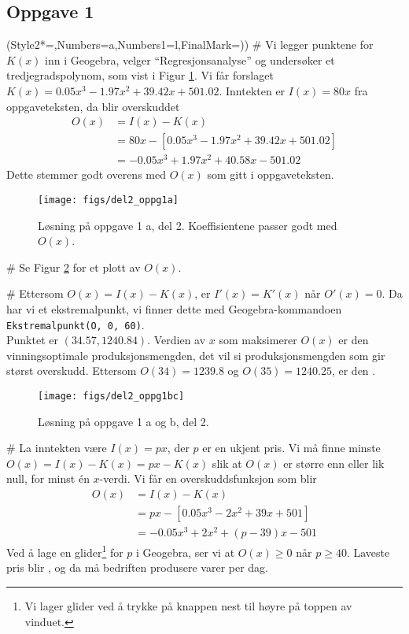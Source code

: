 \subsection*{Oppgave 1}
\begin{easylist}[enumerate]
	\ListProperties(Style2*=,Numbers=a,Numbers1=l,FinalMark={)})
	# Vi legger punktene for $K(x)$ inn i Geogebra, velger ``Regresjonsanalyse'' og undersøker et tredjegradspolynom, som vist i Figur \ref{fig:del2_oppg1a}.
	Vi får forslaget $K(x) = 0.05x^3 - 1.97x^2 + 39.42x + 501.02$.
	Inntekten er $I(x) = 80x$ fra oppgaveteksten, da blir overskuddet
	\begin{align*}
		O(x) &= I(x) - K(x) \\
		&= 80x -\left[ 0.05x^3 - 1.97x^2 + 39.42x + 501.02 \right] \\
		&= - 0.05x^3 + 1.97x^2 + 40.58x - 501.02
	\end{align*}
	Dette stemmer godt overens med $O(x)$ som gitt i oppgaveteksten.
	\begin{figure}[ht!]
		\centering
		\texttt{[image: figs/del2\_oppg1a]}
		\caption{Løsning på oppgave 1 a, del 2. Koeffisientene passer godt med $O(x)$.}
		\label{fig:del2_oppg1a}
	\end{figure}
	# Se Figur \ref{fig:del2_oppg1bc} for et plott av $O(x)$.
	
	# Ettersom $O(x) = I(x) - K(x)$, er $I'(x) = K'(x)$ når $O'(x) = 0$.
	Da har vi et ekstremalpunkt, vi finner dette med Geogebra-kommandoen\\
	\verb|Ekstremalpunkt(O, 0, 60)|. \\
	Punktet er $(34.57, 1240.84)$.
	Verdien av $x$ som maksimerer $O(x)$ er den vinningsoptimale produksjonsmengden, det vil si produksjonsmengden som gir størst overskudd.
	Ettersom $O(34) = 1239.8$ og $O(35)=1240.25$, er den .
	
	\begin{figure}[ht!]
		\centering
		\texttt{[image: figs/del2\_oppg1bc]}
		\caption{Løsning på oppgave 1 a og b, del 2. }
		\label{fig:del2_oppg1bc}
	\end{figure}
	# La inntekten være $I(x) = px$, der $p$ er en ukjent pris.
	Vi må finne minste $O(x) = I(x) - K(x) = px - K(x)$ slik at $O(x)$ er større enn eller lik null, for minst én $x$-verdi.
	Vi får en overskuddsfunksjon som blir
	\begin{align*}
		O(x) &= I(x) - K(x) \\
		&= px -\left[ 0.05x^3 - 2x^2 + 39x + 501 \right] \\
		&= - 0.05x^3 + 2x^2 + (p - 39)x - 501
	\end{align*}
	Ved å lage en glider\footnote{Vi lager glider ved å trykke på knappen nest til høyre på toppen av vinduet.} for $p$ i Geogebra, ser vi at $O(x) \geq 0$ når $p \geq 40$. Laveste pris blir , og da må bedriften produsere  varer per dag.
\end{easylist}


